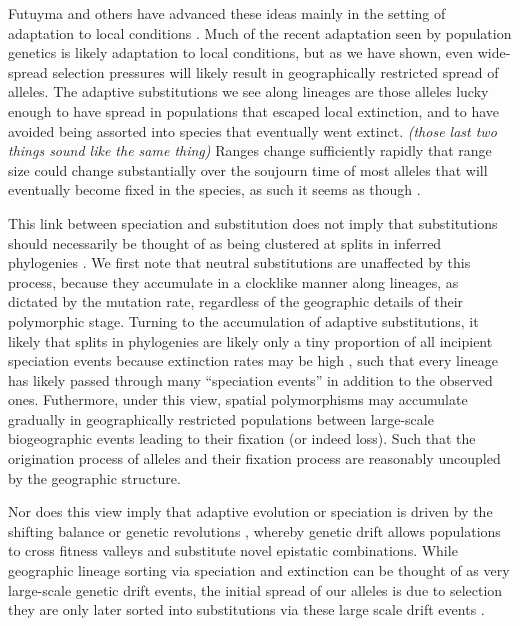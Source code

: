 \documentclass{article}
\newcommand{\plr}[1]{{\it\color{blue}(#1)}}
\begin{document}
Futuyma and others have advanced these ideas mainly in the
setting of adaptation to local conditions 
\citep[particularly local communities ][]{} . 
Much of the recent adaptation seen by
population genetics is likely adaptation to local conditions, 
but as we have shown, even wide-spread selection pressures will likely result in 
geographically restricted spread of alleles.
The adaptive substitutions we see along lineages are those alleles 
lucky enough to have spread in populations that escaped local extinction, 
and to have avoided being assorted into species that eventually went extinct. 
\plr{those last two things sound like the same thing}
Ranges change sufficiently rapidly that
range size could change substantially over the soujourn time of most alleles 
that will eventually become fixed in the species, as such it seems as though . 

This link between speciation and substitution does not imply that
substitutions should necessarily be thought of as being clustered at splits in inferred phylogenies 
\citep[see ][for a recent exhange on this]{Pennell:14,Venditti:14,Pennell:14B}. 
We first note that neutral substitutions are unaffected by this process, 
because they accumulate in a clocklike manner along lineages, 
as dictated by the mutation rate, 
regardless of the geographic details of their polymorphic stage. 
Turning to the accumulation of adaptive substitutions, 
it likely that splits in phylogenies are likely only a tiny proportion of all incipient
speciation events because extinction rates may be high
\citep{Rosenblum:12}, such that every lineage has likely passed through
many ``speciation events'' in addition to the observed ones.
Futhermore, under this view, 
spatial polymorphisms may accumulate gradually in geographically restricted populations
between large-scale biogeographic events leading to their fixation (or indeed loss). 
Such that the origination process of alleles and their fixation process
are reasonably uncoupled \citep[in the sense of ][]{Gillespie:94} by the geographic structure.

 
Nor does this view imply that adaptive evolution or speciation is driven by the
shifting balance or genetic revolutions 
\citep{Wright:32, Mayr-genetic-revol:1954}, 
whereby genetic drift allows
populations to cross fitness valleys and substitute novel epistatic
combinations. While geographic lineage sorting via speciation and
extinction can be thought of as very large-scale genetic drift events,
the initial spread of our alleles is due to selection they are only later sorted 
into substitutions via these large scale drift events \citep[see also
][for discussion]{Futuyma:89}. 
\end{document}
